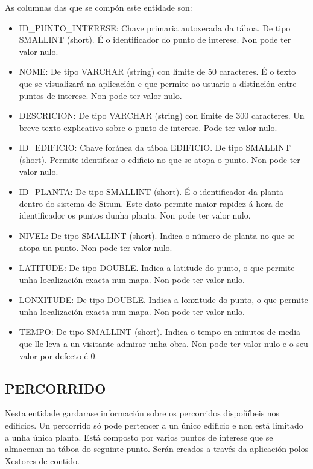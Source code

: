 As columnas das que se compón este entidade son:
\begin{itemize}
	\item ID\_PUNTO\_INTERESE: Chave primaria autoxerada da táboa. De tipo SMALLINT (short). É o identificador do punto de interese. Non pode ter valor nulo.
	\item NOME: De tipo VARCHAR (string) con límite de 50 caracteres. É o texto que se visualizará na aplicación e que permite ao usuario a distinción entre puntos de interese. Non pode ter valor nulo.
	\item DESCRICION: De tipo VARCHAR (string) con límite de 300 caracteres. Un breve texto explicativo sobre o punto de interese. Pode ter valor nulo.
	\item ID\_EDIFICIO: Chave foránea da táboa EDIFICIO. De tipo SMALLINT (short). Permite identificar o edificio no que se atopa o punto. Non pode ter valor nulo.
	\item ID\_PLANTA: De tipo SMALLINT (short). É o identificador da planta dentro do sistema de Situm. Este dato permite maior rapidez á hora de identificador os puntos dunha planta. Non pode ter valor nulo.
	\item NIVEL: De tipo SMALLINT (short). Indica o número de planta no que se atopa un punto. Non pode ter valor nulo.
	\item LATITUDE: De tipo DOUBLE. Indica a latitude do punto, o que permite unha localización exacta nun mapa. Non pode ter valor nulo.
	\item LONXITUDE: De tipo DOUBLE. Indica a lonxitude do punto, o que permite unha localización exacta nun mapa. Non pode ter valor nulo.
	\item TEMPO: De tipo SMALLINT (short). Indica o tempo en minutos de media que lle leva a un visitante admirar unha obra. Non pode ter valor nulo e o seu valor por defecto é 0.
\end{itemize}


\subsection{PERCORRIDO}
Nesta entidade gardarase información sobre os percorridos dispoñíbeis nos edificios. Un percorrido só pode pertencer a un único edificio e non está limitado a unha única planta. Está composto por varios puntos de interese que se almacenan na táboa do seguinte punto. Serán creados a través da aplicación polos Xestores de contido.

